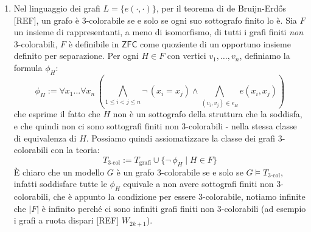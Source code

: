 \begin{soln}
\begin{enumerate}
        \[ T := \{\text{assiomi dei gruppi + abelianità}\} \cup \{\psi_n | n \in \NN, n \geq 1\}
        \]
        dove $\psi_n$ è la $L_{\text{gr}}$-formula: $\forall x \; \exists y \; x = ny$, che esprime la divisibilità per $n$. È chiaro che un gruppo $G$ è abeliano divisibile se e solo se $G \models T$. Supponiamo ora per assurdo che esista $T'$ finita che assiomatizza la classe dei gruppi abeliani divisibili, come prima si ha $T \models T'$, e per compattezza semantica 
        si ha $T'' \subseteq T$ finita tale che $T'' \models T'$. Possiamo assumere, WLOG, che $T'' = T_{\text{gr. ab.}} \cup \{\psi_1, \ldots, \psi_n\}$, dove $T_{\text{gr. ab.}}$ è la teoria dei gruppi abeliani; come nei casi precedenti un gruppo $G$ è abeliano divisibile se e solo se $G \models T''$, ma questo è assurdo perché,
        considerando $S^{-1}\ZZ$, con $S = \{p_1^{e_1}\cdot\ldots\cdot p_{k_n}^{e_{k_n}} | e_i \in \NN, p_i \text{ primo}, p_i \leq n\}$, si ha che $S^{-1}\ZZ \models T''$ (perché ho sufficienti denominatori per dividere ogni intero con un naturale fino ad $n$),
        ma $S^{-1}\ZZ$ non è divisibile per $q$ con $q$ primo e $q > n$ - per cui non ho $1/q$ in $S^{-1}\ZZ$, quindi $S^{-1}\ZZ \not\models T$ $\lightning$.
        \item Nel linguaggio dei grafi $L = \{e(\cdot,\cdot)\}$, per il teorema di de Bruijn-Erdős [REF], un grafo è 3-colorabile se e solo se ogni suo sottografo finito lo è. Sia $F$ un insieme di rappresentanti, a meno di isomorfismo, di tutti i grafi finiti \emph{non} 3-colorabili, $F$ è definibile in $\mathsf{ZFC}$ come quoziente di un opportuno insieme definito per separazione.
        Per ogni $H \in F$ con vertici $v_1, \dots, v_n$, definiamo la formula $\phi_H$:
        \[ \phi_H := \forall x_1 \dots \forall x_n \, \left(\bigwedge_{1 \leq i < j \leq n} \neg\,(x_i = x_j) \land \bigwedge_{(v_i, v_j) \in e_H} e(x_i, x_j) \right) \]
        che esprime il fatto che $H$ non è un sottografo della struttura che la soddisfa, e che quindi non ci sono sottografi finiti non 3-colorabili - nella stessa classe di equivalenza di $H$.
        Possiamo quindi assiomatizzare la classe dei grafi 3-colorabili con la teoria:
        \[ T_{\text{3-col}} := T_{\text{grafi}} \cup \{\neg\,\phi_H \mid H \in F \} \]
        È chiaro che un modello $G$ è un grafo 3-colorabile se e solo se $G \models T_{\text{3-col}}$, infatti soddisfare tutte le $\phi_H$ equivale a non avere sottografi finiti non 3-colorabili, che è appunto la condizione per essere 3-colorabile, notiamo infinite che $|F|$ è infinito perché ci sono infiniti grafi finiti non 3-colorabili (ad esempio i grafi a ruota dispari [REF] $W_{2k+1}$).

\end{enumerate}
\end{soln}
